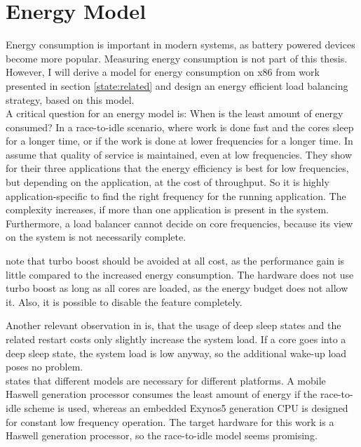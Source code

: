 \section{Energy Model}
\label{design:energy}

Energy consumption is important in modern systems, as battery powered devices
become more popular.
Measuring energy consumption is not part of this thesis.
However, I will derive a model for energy consumption on x86 from work presented
in section \ref{state:related} and design an energy efficient load balancing
strategy, based on this model.
\\

A critical question for an energy model is:
When is the least amount of energy consumed?
In a race-to-idle scenario, where work is done fast and the cores sleep for a
longer time, or if the work is done at lower frequencies for a longer time.
In \cite{le_sueur_slow_2011} \citeauthor{le_sueur_slow_2011} assume that
quality of service is maintained, even at low frequencies.
They show for their three applications that the
energy efficiency is best for low frequencies, but depending on the
application, at the cost of throughput.
So it is highly application-specific to find the right frequency for the
running application.
The complexity increases, if more than one application is present in the
system.
Furthermore, a load balancer cannot decide on core frequencies, because its
view on the system is not necessarily complete.

\citeauthor{le_sueur_slow_2011} note that turbo boost should be avoided at
all cost, as the performance gain is little compared to the increased energy
consumption.
The hardware does not use turbo boost as long as all cores are loaded, as the
energy budget does not allow it.
Also, it is possible to disable the feature completely.


Another relevant observation in \cite{le_sueur_slow_2011} is, that the usage
of deep sleep states and the related restart costs only slightly increase the
system load.
If a core goes into a deep sleep state, the system load is low anyway, so the
additional wake-up load poses no problem.
\\

\cite{imes_poet_2015} states that different models are necessary for different
platforms.
A mobile Haswell generation processor consumes the least amount of energy if
the race-to-idle scheme is used, whereas an embedded Exynos5 generation CPU is
designed for constant low frequency operation.
The target hardware for this work is a Haswell generation processor, so the
race-to-idle model seems promising.
\\

